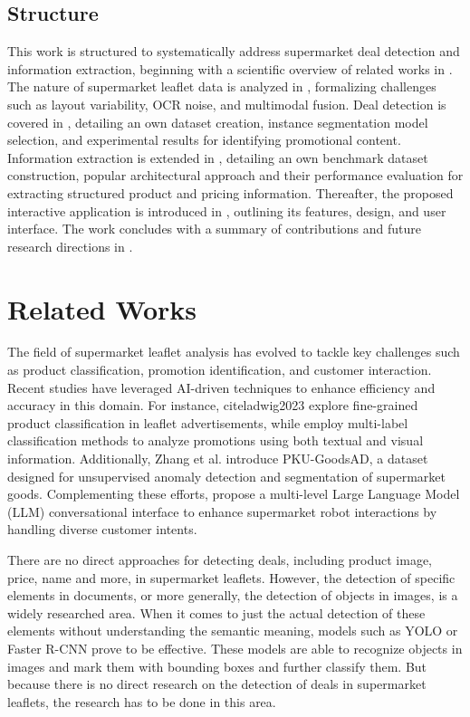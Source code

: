 \documentclass[11pt]{article}
\begin{document}
\subsection{Structure}
This work is structured to systematically address supermarket deal detection and information extraction, beginning with a scientific overview of related works in . The nature of supermarket leaflet data is analyzed in , formalizing challenges such as layout variability, OCR noise, and multimodal fusion. Deal detection is covered in , detailing an own dataset creation, instance segmentation model selection, and experimental results for identifying promotional content. Information extraction is extended in , detailing an own benchmark dataset construction, popular architectural approach and their performance evaluation for extracting structured product and pricing information. Thereafter, the proposed interactive application is introduced in , outlining its features, design, and user interface. The work concludes with a summary of contributions and future research directions in .


\section{Related Works}
\label{sec:related_works}

The field of supermarket leaflet analysis has evolved to tackle key challenges such as product classification, promotion identification, and customer interaction. Recent studies have leveraged AI-driven techniques to enhance efficiency and accuracy in this domain. For instance, cite{ladwig2023} explore fine-grained product classification in leaflet advertisements, while \cite{arroyo2020} employ multi-label classification methods to analyze promotions using both textual and visual information. Additionally, Zhang et al. \cite{zhang2024} introduce PKU-GoodsAD, a dataset designed for unsupervised anomaly detection and segmentation of supermarket goods. Complementing these efforts,\cite{nandkumar2024} propose a multi-level Large Language Model (LLM) conversational interface to enhance supermarket robot interactions by handling diverse customer intents.

There are no direct approaches for detecting deals, including product image, price, name and more, in supermarket leaflets. However, the detection of specific elements in documents, or more generally, the detection of objects in images, is a widely researched area. When it comes to just the actual detection of these elements without understanding the semantic meaning, models such as YOLO or Faster R-CNN prove to be effective. These models are able to recognize objects in images and mark them with bounding boxes and further classify them. But because there is no direct research on the detection of deals in supermarket leaflets, the research has to be done in this area.
\end{document}

